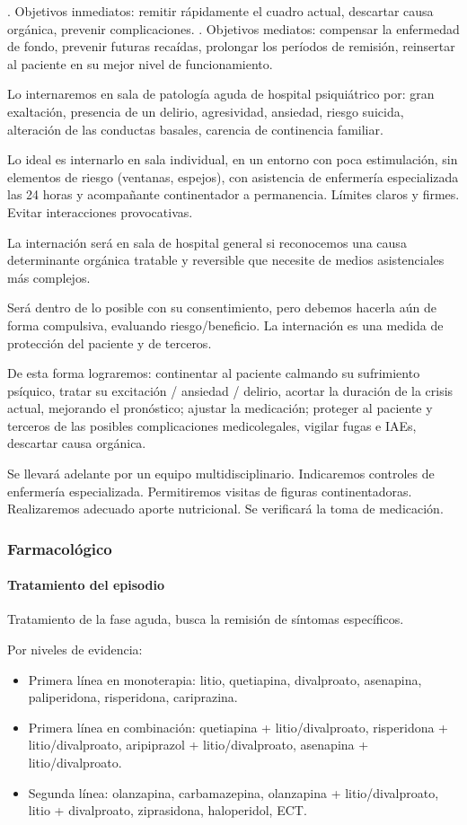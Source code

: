 . Objetivos inmediatos: remitir rápidamente el cuadro actual, descartar causa orgánica, prevenir complicaciones.
. Objetivos mediatos: compensar la enfermedad de fondo, prevenir futuras recaídas, prolongar los períodos de remisión, reinsertar al paciente en su mejor nivel de funcionamiento.

Lo internaremos en sala de patología aguda de hospital psiquiátrico por: gran exaltación, presencia de un delirio, agresividad, ansiedad, riesgo suicida, alteración de las conductas basales, carencia de continencia familiar.

Lo ideal es internarlo en sala individual, en un entorno con poca estimulación, sin elementos de riesgo (ventanas, espejos), con asistencia de enfermería especializada las 24 horas y acompañante continentador a permanencia. Límites claros y firmes. Evitar interacciones provocativas.

La internación será en sala de hospital general si reconocemos una causa determinante orgánica tratable y reversible que necesite de medios asistenciales más complejos. 

Será dentro de lo posible con su consentimiento, pero debemos hacerla aún de forma compulsiva, evaluando riesgo/beneficio. La internación es una medida de protección del paciente y de terceros.

De esta forma lograremos: continentar al paciente calmando su sufrimiento psíquico, tratar su excitación / ansiedad / delirio, acortar la duración de la crisis actual, mejorando el pronóstico; ajustar la medicación; proteger al paciente y terceros de las posibles complicaciones medicolegales, vigilar fugas e IAEs, descartar causa orgánica.

Se llevará adelante por un equipo multidisciplinario. Indicaremos controles de enfermería especializada. Permitiremos visitas de figuras continentadoras. Realizaremos adecuado aporte nutricional. Se verificará la toma de medicación.
\subsubsection*{Farmacológico}
\paragraph{Tratamiento del episodio}
Tratamiento de la fase aguda, busca la remisión de síntomas específicos.

Por niveles de evidencia:
\begin{itemize}
	\item Primera línea en monoterapia: litio, quetiapina, divalproato, asenapina, paliperidona, risperidona, cariprazina.
	\item Primera línea en combinación: quetiapina + litio/divalproato, risperidona + litio/divalproato, aripiprazol + litio/divalproato, asenapina + litio/divalproato.
	\item Segunda línea: olanzapina, carbamazepina, olanzapina + litio/divalproato, litio + divalproato, ziprasidona, haloperidol, ECT.
\end{itemize}

